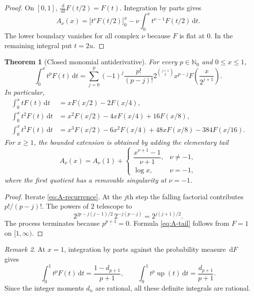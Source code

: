 \documentclass[11pt,oneside]{article}
\newtheorem{theorem}{Theorem}[section]
\theoremstyle{definition}
\theoremstyle{remark}
\newtheorem{remark}[theorem]{Remark}
\newcommand{\N}{\mathbb N}
\newcommand{\dd}{\,\mathrm d}
\newcommand{\upf}{\operatorname{up}}
\newcommand{\falling}[2]{#1^{\underline{#2}}}
\begin{document}
\begin{proof}
On $[0,1]$, $\frac{\dd}{\dd t}F(t/2)=F(t)$.  Integration by parts gives
\[
 A_\nu(x)=\bigl[t^\nu F(t/2)\bigr]_{0}^{x}
 -\nu\int_0^x t^{\nu-1}F(t/2)\dd t.
\]
The lower boundary vanishes for all complex $\nu$ because $F$ is flat at $0$.  In the remaining integral put $t=2u$.
\end{proof}

\begin{theorem}[Closed monomial antiderivative]\label{thm:integer-weight-antiderivative}
For every $p\in\N_0$ and $0\le x\le1$,
\begin{equation}\label{eq:integer-weight-antiderivative}
\boxed{
 \int_0^x t^pF(t)\dd t
 =\sum_{j=0}^{p}(-1)^j\frac{p!}{(p-j)!}
 2^{\binom{j+1}{2}}x^{p-j}
 F\!\left(\frac{x}{2^{j+1}}\right).}
\end{equation}
In particular,
\begin{align}
\int_0^x tF(t)\dd t
 &=xF(x/2)-2F(x/4),\label{eq:A1}\\
\int_0^x t^2F(t)\dd t
 &=x^2F(x/2)-4xF(x/4)+16F(x/8),\label{eq:A2}\\
\int_0^x t^3F(t)\dd t
 &=x^3F(x/2)-6x^2F(x/4)+48xF(x/8)-384F(x/16).
\end{align}
For $x\ge1$, the bounded extension is obtained by adding the elementary tail
\begin{equation}\label{eq:A-tail}
 A_\nu(x)=A_\nu(1)+
 \begin{cases}
 \dfrac{x^{\nu+1}-1}{\nu+1},&\nu\ne-1,\\[0.7em]
 \log x,&\nu=-1,
 \end{cases}
\end{equation}
where the first quotient has a removable singularity at $\nu=-1$.
\end{theorem}

\begin{proof}
Iterate \eqref{eq:A-recurrence}.  At the $j$th step the falling factorial contributes $p!/(p-j)!$.  The powers of $2$ telescope to
\[
 2^{jp-j(j-1)/2}\,2^{-j(p-j)}=2^{j(j+1)/2}.
\]
The process terminates because $\falling{p}{p+1}=0$.  Formula \eqref{eq:A-tail} follows from $F=1$ on $[1,\infty)$.
\end{proof}

\begin{remark}
At $x=1$, integration by parts against the probability measure $\dd F$ gives
\begin{equation}\label{eq:integer-definite-moment}
 \int_0^1t^pF(t)\dd t=\frac{1-d_{p+1}}{p+1},
 \qquad
 \int_0^1t^p\upf(t)\dd t=\frac{d_{p+1}}{p+1}.
\end{equation}
Since the integer moments $d_n$ are rational, all these definite integrals are rational.
\end{remark}
\end{document}
